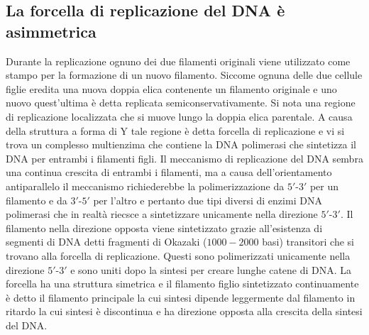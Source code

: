 \subsection{La forcella di replicazione del DNA \`e asimmetrica}
Durante la replicazione ognuno dei due filamenti originali viene utilizzato come stampo per la formazione di un nuovo filamento. Siccome ognuna delle due cellule figlie eredita una nuova
doppia elica contenente un filamento originale e uno nuovo quest'ultima \`e detta replicata semiconservativamente. Si nota una regione di replicazione localizzata che si muove lungo
la doppia elica parentale. A causa della struttura a forma di Y tale regione \`e detta forcella di replicazione e vi si trova un complesso multienzima che contiene la DNA polimerasi che
sintetizza il DNA per entrambi i filamenti figli. Il meccanismo di replicazione del DNA sembra una continua crescita di entrambi i filamenti, ma a causa dell'orientamento antiparallelo
il meccanismo richiederebbe la polimerizzazione da $5'$-$3'$ per un filamento e da $3'$-$5'$ per l'altro e pertanto due tipi diversi di enzimi DNA polimerasi che in realt\`a riecsce a 
sintetizzare unicamente nella direzione $5'$-$3'$. Il filamento nella direzione opposta viene sintetizzato grazie all'esistenza di segmenti di DNA detti fragmenti di Okazaki ($1000-2000$
basi) transitori che si trovano alla forcella di replicazione. Questi sono polimerizzati unicamente nella direzione $5'$-$3'$ e sono uniti dopo la sintesi per creare lunghe catene di 
DNA. La forcella ha una struttura simetrica e il filamento figlio sintetizzato continuamente \`e detto il filamento principale la cui sintesi dipende leggermente dal filamento in ritardo
la cui sintesi \`e discontinua e ha direzione opposta alla crescita della sintesi del DNA.
